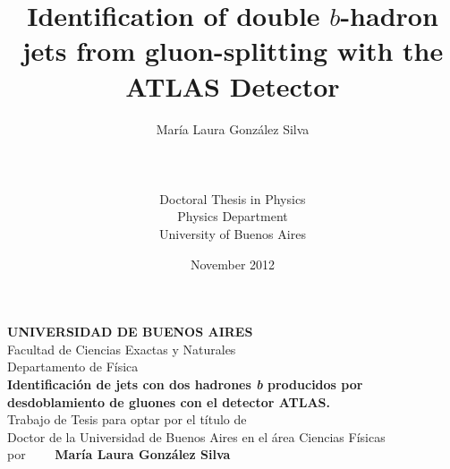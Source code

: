 \documentclass[11pt,a4paper,12pt]{report}
\title{Identification of double $b$-hadron jets from gluon-splitting with the ATLAS Detector}
\author{Mar\'ia Laura Gonz\'alez Silva \\ \\ \\ \\Doctoral Thesis in Physics\\Physics Department\\University of Buenos Aires}
\date{November 2012}
\begin{document}
\maketitle


\newpage

\thispagestyle{empty}
\begin{figure}[h]
  \begin{center}
  \end{center}
\end{figure}

\begin{center}
  {\bfseries UNIVERSIDAD DE BUENOS AIRES}\\
  \vspace{0.5cm}
  Facultad de Ciencias Exactas y Naturales\\
  \vspace{0.5cm}
  Departamento de F\'isica\\
  \vspace{1.5cm}
         {\large {\bfseries Identificaci\'on de jets con dos hadrones \emph{b} producidos por desdoblamiento de gluones con el detector ATLAS.}}\\ %
         \vspace{1.5cm}
         Trabajo de Tesis para optar por el t\'itulo de \\
         Doctor de la Universidad de Buenos Aires en el \'area Ciencias F\'isicas\\
         \vspace{1.5cm}
         por $\qquad ${\bfseries Mar\'ia Laura Gonz\'alez Silva}\\
         \vspace{1.5cm}
\end{center}
\end{document}
